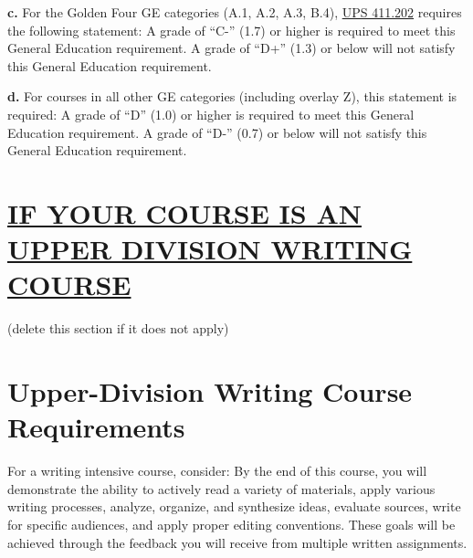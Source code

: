 \documentclass[12pt]{article} %
\begin{document}
\vspace{0.5em}

\noindent \textbf{c.} {\color{annotationblue}For the Golden Four GE categories (A.1, A.2, A.3, B.4), \href{https://www.fullerton.edu/senate/publications_policies_resolutions/ups/UPS\%20400/UPS\%20411.202.pdf}{UPS 411.202} requires the following statement:} A grade of ``C-'' (1.7) or higher is required to meet this General Education requirement. A grade of ``D+'' (1.3) or below will not satisfy this General Education requirement.

\vspace{0.5em}

\noindent \textbf{d.} {\color{annotationblue}For courses in all other GE categories (including overlay Z), this statement is required:} A grade of ``D'' (1.0) or higher is required to meet this General Education requirement. A grade of ``D-'' (0.7) or below will not satisfy this General Education requirement.

\section*{\underline{IF YOUR COURSE IS AN UPPER DIVISION WRITING COURSE}} {\color{annotationblue}(delete this section if it does not apply)}

\section*{Upper-Division Writing Course Requirements}

 {\color{suggestionred}For a writing intensive course, consider: By the end of this course, you will demonstrate the ability to actively read a variety of materials, apply various writing processes, analyze, organize, and synthesize ideas, evaluate sources, write for specific audiences, and apply proper editing conventions. These goals will be achieved through the feedback you will receive from multiple written assignments.}

\vspace{0.5em}
\end{document}
